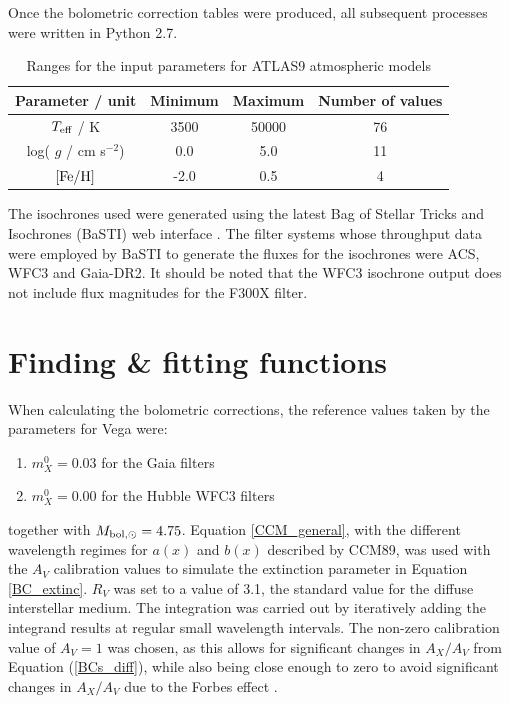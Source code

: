 \documentclass[12pt, a4paper]{report}
\begin{document}
Once the bolometric correction tables were produced, all subsequent processes were written in Python 2.7.

\begin{table}
\begin{center}
\begin{tabular}{cccc}
\hline
Parameter / unit & Minimum & Maximum & Number of values \\
\hline
$T_{\textnormal{eff}}$ / K & 3500 & 50000 & 76 \\
log( $g$ / cm s$^{-2}$) & 0.0 & 5.0 & 11 \\
$\textnormal{[Fe/H]}$ & -2.0 & 0.5 & 4 \\
\hline
\end{tabular}
\caption{Ranges for the input parameters for ATLAS9 atmospheric models}
\label{atlas9_input}
\end{center}
\end{table}


The isochrones used were generated using the latest Bag of Stellar Tricks and Isochrones (BaSTI) web interface \citep{2018ApJ...856..125H}. The filter systems whose throughput data were employed by BaSTI to generate the fluxes for the isochrones were ACS, WFC3 and Gaia-DR2. It should be noted that the WFC3 isochrone output does not include flux magnitudes for the F300X filter.

\section{Finding \& fitting functions} \label{find_fit}
When calculating the bolometric corrections, the reference values taken by the parameters for Vega were:

\begin{enumerate}
\item $m_{X}^{0} = 0.03$ for the Gaia filters
\item $m_{X}^{0} = 0.00$ for the Hubble WFC3 filters
\end{enumerate}

together with $M_{\textnormal{bol},\odot} = 4.75$. Equation \ref{CCM_general}, with the different wavelength regimes for $a(x)$ and $b(x)$ described by CCM89, was used with the $A_{V}$ calibration values to simulate the extinction parameter in Equation \ref{BC_extinc}. $R_{V}$ was set to a value of 3.1, the standard value for the diffuse interstellar medium. The integration was carried out by iteratively adding the integrand results at regular small wavelength intervals. The non-zero calibration value of $A_{V} = 1$ was chosen, as this allows for significant changes in $A_{X}/A_{V}$ from Equation (\ref{BCs_diff}), while also being close enough to zero to avoid significant changes in $A_{X}/A_{V}$ due to the Forbes effect \citep{2008PASP..120..583G}.
\end{document}
